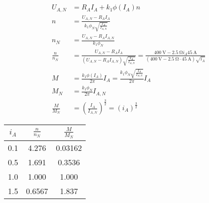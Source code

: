 \documentclass[11pt,a4paper]{scrartcl}
\newcommand{\mybr}[1]{\left(#1\right)}
\newcommand{\0}{_{\mybr{0}}}
\newcommand{\1}{_{\mybr{1}}}
\newcommand{\2}{_{\mybr{2}}}
\begin{document}
\subsection{}
\begin{align}
U_{A,N}&=R_A I_A+k_1\phi\mybr{I_A}n\\
n&=\frac{U_{A,N}-R_A I_A}{k_1\phi_N\sqrt{\frac{I_A}{I_{A,N}}}}\\
n_N&=\frac{U_{A,N}-R_A I_{A,N}}{k_1\phi_N}\\
\frac{n}{n_N}&=\frac{U_{A,N}-R_A I_A}{\mybr{U_{A,N}-R_A I_{A,N}}\sqrt{\frac{I_A}{I_{A,N}}}}=\frac{\SI{400}{\volt}-\SI{2.5}{\ohm}i_A\SI{45}{\ampere}}{\mybr{\SI{400}{\volt}-\SI{2.5}{\ohm}\cdot\SI{45}{\ampere}}\sqrt{i_A}}\\
M&=\frac{k_1\phi\mybr{I_A}}{2\pi}I_A=\frac{k_1\phi_N\sqrt{\frac{I_A}{I_{A,N}}}}{2\pi}I_A\\
M_N&=\frac{k_1\phi_N}{2\pi}I_{A,N}\\
\frac{M}{M_N}&=\mybr{\frac{I_A}{I_{A,N}}}^{\frac{3}{2}}=\mybr{i_A}^{\frac{3}{2}}
\end{align}
\begin{table}[htbp]
	\begin{center}
	\begin{tabular}{SSS}
		\toprule
		{$i_A$} & {$\frac{n}{n_N}$} & {$\frac{M}{M_N}$} \\
		 & 4.276 & 0.03162 \\
		0.5 & 1.691 & 0.3536 \\
		1.0 & 1.000 & 1.000 \\
		1.5 & 0.6567 & 1.837 \\
		\bottomrule
	\end{tabular}
	\end{center}
\end{table}
\begin{figure*}[!hp]
\centering
{}
\end{figure*}

\clearpage
\end{document}
